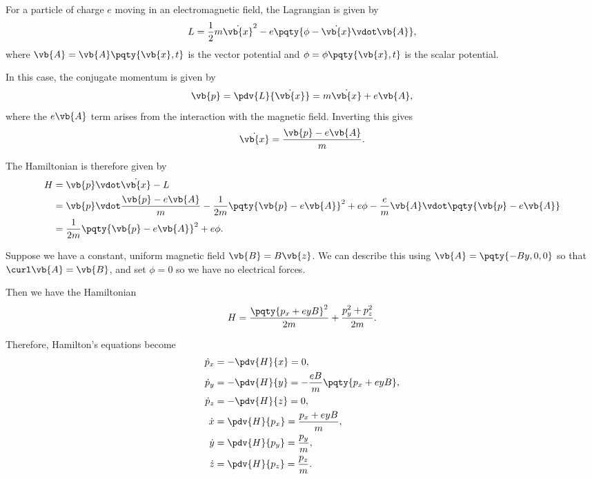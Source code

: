 \begin{example}
    For a particle of charge \(e\) moving in an electromagnetic field, the Lagrangian is given by
    \begin{equation}
        L = \frac{1}{2} m \dot{\vb{x}}^2 - e \pqty{\phi - \dot{\vb{x}} \vdot \vb{A}},
    \end{equation}
    where \(\vb{A} = \vb{A}\pqty{\vb{x}, t}\) is the vector potential and \(\phi = \phi\pqty{\vb{x}, t}\) is the scalar potential.

    In this case, the conjugate momentum is given by
    \begin{equation}
        \vb{p} = \pdv{L}{\dot{\vb{x}}} = m \dot{\vb{x}} + e \vb{A},
    \end{equation}
    where the \(e \vb{A}\) term arises from the interaction with the magnetic field. Inverting this gives
    \begin{equation}
        \dot{\vb{x}} = \frac{\vb{p} - e \vb{A}}{m}.
    \end{equation}

    The Hamiltonian is therefore given by
    \begin{subequations}
        \begin{align}
            H &= \vb{p} \vdot \dot{\vb{x}} - L \\
            &= \vb{p} \vdot \frac{\vb{p} - e \vb{A}}{m} - \frac{1}{2m} \pqty{\vb{p} - e \vb{A}}^2 + e \phi  - \frac{e}{m} \vb{A} \vdot \pqty{\vb{p} - e \vb{A}} \\
            &= \frac{1}{2m} \pqty{\vb{p} - e \vb{A}}^2 + e \phi.
        \end{align}
    \end{subequations}

    Suppose we have a constant, uniform magnetic field \(\vb{B} = B \vb{z}\). We can describe this using \(\vb{A} = \pqty{- By, 0, 0}\) so that \(\curl \vb{A} = \vb{B}\), and set \(\phi = 0\) so we have no electrical forces.

    Then we have the Hamiltonian
    \begin{equation}
        H = \frac{\pqty{p_x + e y B}^2}{2m} + \frac{p_y^2 + p_z^2}{2m}.
    \end{equation}

    Therefore, Hamilton's equations become
    \begin{subequations}
        \begin{align}
            \dot{p}_x &= - \pdv{H}{x} = 0, \\
            \dot{p}_y &= - \pdv{H}{y} = - \frac{e B}{m} \pqty{p_x + e y B}, \\
            \dot{p}_z &= - \pdv{H}{z} = 0, \\
            \dot{x} &= \pdv{H}{p_x} = \frac{p_x + e y B}{m}, \\
            \dot{y} &= \pdv{H}{p_y} = \frac{p_y}{m}, \\
            \dot{z} &= \pdv{H}{p_z} = \frac{p_z}{m}.
        \end{align}
    \end{subequations}


\end{example}
